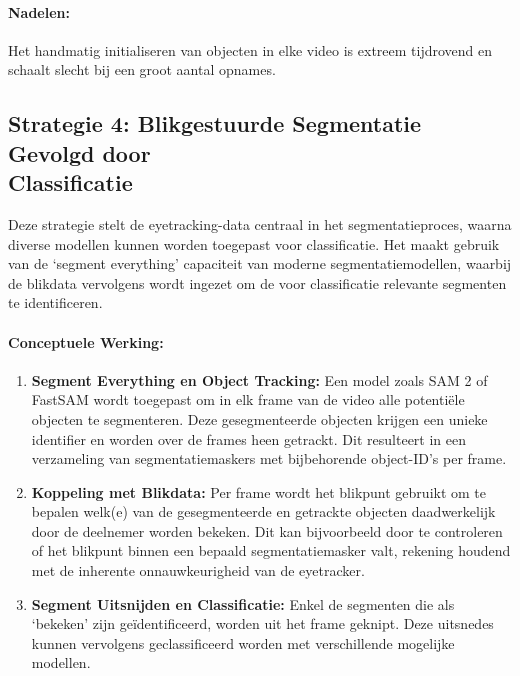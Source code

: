 \paragraph{Nadelen:}
Het handmatig initialiseren van objecten in elke video is extreem tijdrovend en schaalt slecht bij een groot aantal opnames.

\subsection{Strategie 4: Blikgestuurde Segmentatie Gevolgd door\\ Classificatie}

Deze strategie stelt de eyetracking-data centraal in het segmentatieproces, waarna diverse modellen kunnen worden toegepast voor classificatie.
Het maakt gebruik van de `segment everything' capaciteit van moderne segmentatiemodellen, waarbij de blikdata vervolgens wordt ingezet om de voor classificatie relevante segmenten te identificeren.

\paragraph{Conceptuele Werking:}
\begin{enumerate}
    \item \textbf{Segment Everything en Object Tracking:} Een model zoals SAM 2 of FastSAM wordt toegepast om in elk frame van de video alle potentiële objecten te segmenteren. 
    Deze gesegmenteerde objecten krijgen een unieke identifier en worden over de frames heen getrackt. Dit resulteert in een verzameling van segmentatiemaskers met bijbehorende object-ID's per frame.
    \item \textbf{Koppeling met Blikdata:} Per frame wordt het blikpunt gebruikt om te bepalen welk(e) van de gesegmenteerde en getrackte objecten daadwerkelijk door de deelnemer worden bekeken. 
    Dit kan bijvoorbeeld door te controleren of het blikpunt binnen een bepaald segmentatiemasker valt, rekening houdend met de inherente onnauwkeurigheid van de eyetracker.
    \item \textbf{Segment Uitsnijden en Classificatie:} Enkel de segmenten die als `bekeken' zijn geïdentificeerd, worden uit het frame geknipt.
    Deze uitsnedes kunnen vervolgens geclassificeerd worden met verschillende mogelijke modellen.
\end{enumerate}

